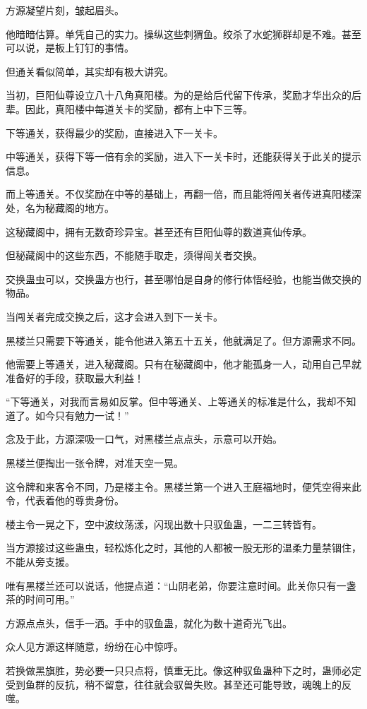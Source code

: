 \begin{this_body}
方源凝望片刻，皱起眉头。

他暗暗估算。单凭自己的实力。操纵这些刺猬鱼。绞杀了水蛇狮群却是不难。甚至可以说，是板上钉钉的事情。

但通关看似简单，其实却有极大讲究。

当初，巨阳仙尊设立八十八角真阳楼。为的是给后代留下传承，奖励才华出众的后辈。因此，真阳楼中每道关卡的奖励，都有上中下三等。

下等通关，获得最少的奖励，直接进入下一关卡。

中等通关，获得下等一倍有余的奖励，进入下一关卡时，还能获得关于此关的提示信息。

而上等通关。不仅奖励在中等的基础上，再翻一倍，而且能将闯关者传进真阳楼深处，名为秘藏阁的地方。

这秘藏阁中，拥有无数奇珍异宝。甚至还有巨阳仙尊的数道真仙传承。

但秘藏阁中的这些东西，不能随手取走，须得闯关者交换。

交换蛊虫可以，交换蛊方也行，甚至哪怕是自身的修行体悟经验，也能当做交换的物品。

当闯关者完成交换之后，这才会进入到下一关卡。

黑楼兰只需要下等通关，能令他进入第五十五关，他就满足了。但方源需求不同。

他需要上等通关，进入秘藏阁。只有在秘藏阁中，他才能孤身一人，动用自己早就准备好的手段，获取最大利益！

“下等通关，对我而言易如反掌。但中等通关、上等通关的标准是什么，我却不知道了。如今只有勉力一试！”

念及于此，方源深吸一口气，对黑楼兰点点头，示意可以开始。

黑楼兰便掏出一张令牌，对准天空一晃。

这令牌和来客令不同，乃是楼主令。黑楼兰第一个进入王庭福地时，便凭空得来此令，代表着他的尊贵身份。

楼主令一晃之下，空中波纹荡漾，闪现出数十只驭鱼蛊，一二三转皆有。

当方源接过这些蛊虫，轻松炼化之时，其他的人都被一股无形的温柔力量禁锢住，不能从旁支援。

唯有黑楼兰还可以说话，他提点道：“山阴老弟，你要注意时间。此关你只有一盏茶的时间可用。”

方源点点头，信手一洒。手中的驭鱼蛊，就化为数十道奇光飞出。

众人见方源这样随意，纷纷在心中惊呼。

若换做黑旗胜，势必要一只只点将，慎重无比。像这种驭鱼蛊种下之时，蛊师必定受到鱼群的反抗，稍不留意，往往就会驭兽失败。甚至还可能导致，魂魄上的反噬。


\end{this_body}
